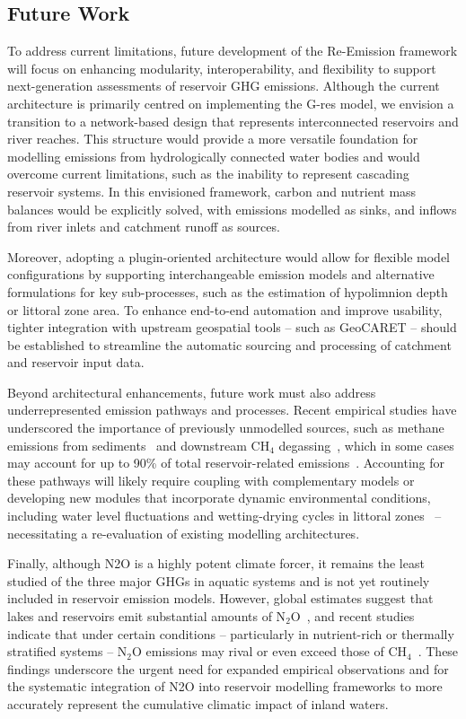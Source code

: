 \documentclass[final,1p,times]{elsarticle}
\begin{document}
\subsection{Future Work}
\label{subsec:future_work}

To address current limitations, future development of the Re-Emission framework will focus on enhancing modularity, interoperability, and flexibility to support next-generation assessments of reservoir \ac{GHG} emissions.
Although the current architecture is primarily centred on implementing the G-res model, we envision a transition to a network-based design that represents interconnected reservoirs and river reaches.
This structure would provide a more versatile foundation for modelling emissions from hydrologically connected water bodies and would overcome current limitations, such as the inability to represent cascading reservoir systems.
In this envisioned framework, carbon and nutrient mass balances would be explicitly solved, with emissions modelled as sinks, and inflows from river inlets and catchment runoff as sources.

Moreover, adopting a plugin-oriented architecture would allow for flexible model configurations by supporting interchangeable emission models and alternative formulations for key sub-processes, such as the estimation of hypolimnion depth or littoral zone area.
To enhance end-to-end automation and improve usability, tighter integration with upstream geospatial tools -- such as GeoCARET -- should be established to streamline the automatic sourcing and processing of catchment and reservoir input data.

Beyond architectural enhancements, future work must also address underrepresented emission pathways and processes.
Recent empirical studies have underscored the importance of previously unmodelled sources, such as methane emissions from sediments~\cite{gruca2011, Isidorova2019-ft} and downstream CH$_4$ degassing~\cite{Soued2022, Zhou2024}, which in some cases may account for up to 90\% of total reservoir-related emissions~\cite{Deshmukh}.
Accounting for these pathways will likely require coupling with complementary models or developing new modules that incorporate dynamic environmental conditions, including water level fluctuations and wetting-drying cycles in littoral zones~\cite{Calamita2021, Ion2021} -- necessitating a re-evaluation of existing modelling architectures.

Finally, although \acf{N2O} is a highly potent climate forcer, it remains the least studied of the three major \acp{GHG} in aquatic systems and is not yet routinely included in reservoir emission models.
However, global estimates suggest that lakes and reservoirs emit substantial amounts of N$_2$O~\cite{Li2024}, and recent studies indicate that under certain conditions -- particularly in nutrient-rich or thermally stratified systems -- N$_2$O emissions may rival or even exceed those of CH$_4$~\cite{Chen2025}.
These findings underscore the urgent need for expanded empirical observations and for the systematic integration of \ac{N2O} into reservoir modelling frameworks to more accurately represent the cumulative climatic impact of inland waters.
\end{document}
